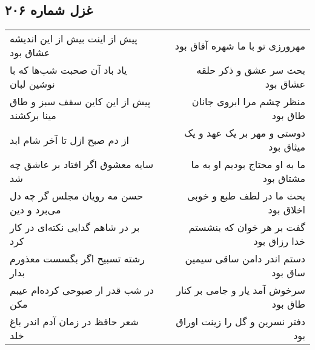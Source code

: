 \begin{center}
\section*{غزل شماره ۲۰۶}
\label{sec:sh206}
\begin{longtable}{l p{0.5cm} r}
پیش از اینت بیش از این اندیشه عشاق بود
&&
مهرورزی تو با ما شهره آفاق بود
\\
یاد باد آن صحبت شب‌ها که با نوشین لبان
&&
بحث سر عشق و ذکر حلقه عشاق بود
\\
پیش از این کاین سقف سبز و طاق مینا برکشند
&&
منظر چشم مرا ابروی جانان طاق بود
\\
از دم صبح ازل تا آخر شام ابد
&&
دوستی و مهر بر یک عهد و یک میثاق بود
\\
سایه معشوق اگر افتاد بر عاشق چه شد
&&
ما به او محتاج بودیم او به ما مشتاق بود
\\
حسن مه رویان مجلس گر چه دل می‌برد و دین
&&
بحث ما در لطف طبع و خوبی اخلاق بود
\\
بر در شاهم گدایی نکته‌ای در کار کرد
&&
گفت بر هر خوان که بنشستم خدا رزاق بود
\\
رشته تسبیح اگر بگسست معذورم بدار
&&
دستم اندر دامن ساقی سیمین ساق بود
\\
در شب قدر ار صبوحی کرده‌ام عیبم مکن
&&
سرخوش آمد یار و جامی بر کنار طاق بود
\\
شعر حافظ در زمان آدم اندر باغ خلد
&&
دفتر نسرین و گل را زینت اوراق بود
\\
\end{longtable}
\end{center}
